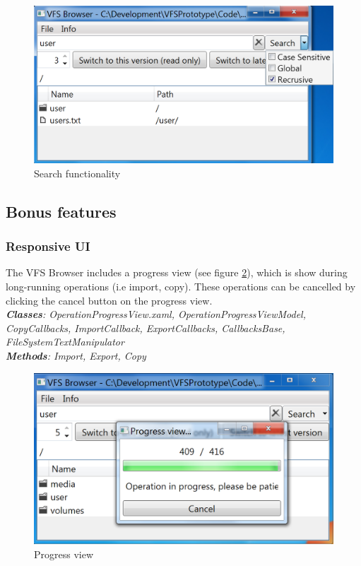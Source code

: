 \documentclass[JCDReport.tex]{subfiles}
\begin{document}
\begin{figure}[h!]
  \centering
  \includegraphics[scale=0.35]{Images/search.png} 
  \caption{Search functionality}
  \label{img:searchFunctions}
\end{figure}


\subsection{Bonus features}

\subsubsection{Responsive UI}
The VFS Browser includes a progress view (see figure \ref{img:progressView}), which is show during long-running operations (i.e import, copy). These operations can be cancelled by clicking the cancel button on the progress view.\\
\textit{\textbf{Classes}: OperationProgressView.xaml, OperationProgressViewModel, CopyCallbacks, ImportCallback, ExportCallbacks, CallbacksBase, FileSystemTextManipulator\\
\textbf{Methods}: Import, Export, Copy}

\begin{figure}[h!]
  \centering
  \includegraphics[scale=0.35]{Images/progress.png} 
  \caption{Progress view}
  \label{img:progressView}
\end{figure}
\end{document}

